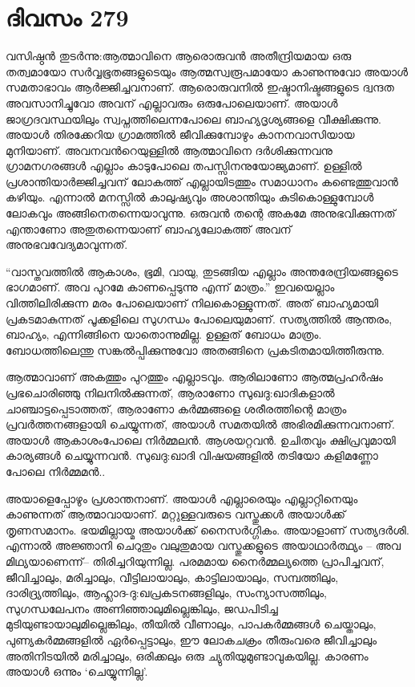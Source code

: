 \section{ദിവസം 279}


വസിഷ്ഠന്‍ തുടര്‍ന്നു:ആത്മാവിനെ ആരൊരുവന്‍ അതീന്ദ്രിയമായ ഒരു തത്വമായോ സര്‍വ്വഭൂതങ്ങളുടെയും ആത്മസ്വരൂപമായോ കാണുന്നുവോ അയാള്‍ സമതാഭാവം ആര്‍ജ്ജിച്ചവനാണ്. ആരൊരുവനില്‍ ഇഷ്ടാനിഷ്ടങ്ങളുടെ ദ്വന്ദത അവസാനിച്ചുവോ അവന് എല്ലാവരും ഒരുപോലെയാണ്. അയാള്‍ ജാഗ്രദവസ്ഥയിലും സ്വപ്നത്തിലെന്നപോലെ ബാഹ്യദൃശ്യങ്ങളെ വീക്ഷിക്കുന്നു. അയാള്‍ തിരക്കേറിയ ഗ്രാമത്തില്‍ ജീവിക്കുമ്പോഴും കാനനവാസിയായ മുനിയാണ്. അവനവന്‍റെയുള്ളില്‍ ആത്മാവിനെ ദര്‍ശിക്കുന്നവനു ഗ്രാമനഗരങ്ങള്‍ എല്ലാം കാടുപോലെ തപസ്സിനനുയോജ്യമാണ്. ഉള്ളില്‍ പ്രശാന്തിയാര്‍ജ്ജിച്ചവന് ലോകത്ത്‌ എല്ലായിടത്തും സമാധാനം കണ്ടെത്തുവാന്‍ കഴിയും. എന്നാല്‍ മനസ്സില്‍ കാലുഷ്യവും അശാന്തിയും കുടികൊള്ളുമ്പോള്‍ ലോകവും അങ്ങിനെതന്നെയാവുന്നു. ഒരുവന്‍ തന്റെ അകമേ അനുഭവിക്കുന്നത് എന്താണോ അതുതന്നെയാണ് ബാഹ്യലോകത്ത് അവന് അനുഭവവേദ്യമാവുന്നത്.
      
“വാസ്തവത്തില്‍ ആകാശം, ഭൂമി, വായു, തുടങ്ങിയ എല്ലാം അന്തരേന്ദ്രിയങ്ങളുടെ ഭാഗമാണ്. അവ പുറമേ കാണപ്പെടുന്നു എന്ന് മാത്രം.” ഇവയെല്ലാം വിത്തിലിരിക്കുന്ന മരം പോലെയാണ് നിലകൊള്ളുന്നത്. അത് ബാഹ്യമായി പ്രകടമാകുന്നത് പൂക്കളിലെ സുഗന്ധം പോലെയുമാണ്. സത്യത്തില്‍ ആന്തരം, ബാഹ്യം, എന്നിങ്ങിനെ യാതൊന്നുമില്ല. ഉള്ളത് ബോധം മാത്രം. ബോധത്തിലെന്തു സങ്കല്‍പ്പിക്കുന്നുവോ അതങ്ങിനെ പ്രകടിതമായിത്തീരുന്നു.

ആത്മാവാണ് അകത്തും പുറത്തും എല്ലാടവും. ആരിലാണോ ആത്മപ്രഹര്‍ഷം പ്രഭചൊരിഞ്ഞു നിലനില്‍ക്കുന്നത്‌, ആരാണോ സുഖദു:ഖാദികളാല്‍ ചാഞ്ചാട്ടപ്പെടാത്തത്, ആരാണോ കര്‍മ്മങ്ങളെ ശരീരത്തിന്റെ മാത്രം പ്രവര്‍ത്തനങ്ങളായി ചെയ്യുന്നത്, അയാള്‍ സമതയില്‍ അഭിരമിക്കുന്നവനാണ്. അയാള്‍ ആകാശംപോലെ നിര്‍മ്മലന്‍. ആശയറ്റവന്‍. ഉചിതവും ക്ഷിപ്രവുമായി കാര്യങ്ങള്‍ ചെയ്യുന്നവന്‍. സുഖദു:ഖാദി വിഷയങ്ങളില്‍ തടിയോ കളിമണ്ണോ പോലെ നിര്‍മ്മമന്‍..

അയാളെപ്പോഴും പ്രശാന്തനാണ്. അയാള്‍ എല്ലാരെയും എല്ലാറ്റിനെയും കാണുന്നത് ആത്മാവായാണ്. മറ്റുള്ളവരുടെ വസ്തുക്കള്‍ അയാള്‍ക്ക് തൃണസമാനം. ഭയമില്ലായ്മ അയാള്‍ക്ക്‌ നൈസര്‍ഗ്ഗികം. അയാളാണ് സത്യദര്‍ശി. എന്നാല്‍ അജ്ഞാനി ചെറുതും വലുതുമായ വസ്തുക്കളുടെ അയാഥാര്‍ത്ഥ്യം – അവ മിഥ്യയാണെന്ന്– തിരിച്ചറിയുന്നില്ല. പരമമായ നൈര്‍മ്മല്യത്തെ പ്രാപിച്ചവന്, ജീവിച്ചാലും, മരിച്ചാലും, വീട്ടിലായാലും, കാട്ടിലായാലും, സമ്പത്തിലും, ദാരിദ്ര്യത്തിലും, ആഹ്ലാദ-ദു:ഖപ്രകടനങ്ങളിലും, സംന്യാസത്തിലും, സുഗന്ധലേപനം അണിഞ്ഞാലുമില്ലെങ്കിലും, ജഡപിടിച്ച മുടിയുണ്ടായാലുമില്ലെങ്കിലും, തീയില്‍ വീണാലും, പാപകര്‍മ്മങ്ങള്‍ ചെയ്താലും, പുണ്യകര്‍മ്മങ്ങളില്‍ ഏര്‍പ്പെട്ടാലും, ഈ ലോകചക്രം തീരുംവരെ ജീവിച്ചാലും അതിനിടയില്‍ മരിച്ചാലും, ഒരിക്കലും ഒരു ച്യുതിയുമുണ്ടാവുകയില്ല.  കാരണം അയാള്‍ ഒന്നും ‘ചെയ്യുന്നില്ല’.

